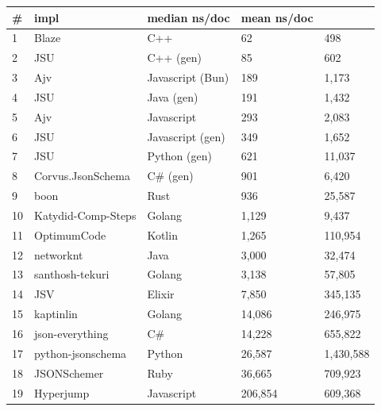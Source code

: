 \begin{tabular}{ll|l|ll}
\# & impl & median ns/doc & mean ns/doc \\
\hline
1 & Blaze & C++ & 62 & 498 \\
2 & JSU & C++ (gen) & 85 & 602 \\
3 & Ajv & Javascript (Bun) & 189 & 1,173 \\
4 & JSU & Java (gen) & 191 & 1,432 \\
5 & Ajv & Javascript & 293 & 2,083 \\
6 & JSU & Javascript (gen) & 349 & 1,652 \\
7 & JSU & Python (gen) & 621 & 11,037 \\
8 & Corvus.JsonSchema & C\# (gen) & 901 & 6,420 \\
9 & boon & Rust & 936 & 25,587 \\
10 & Katydid-Comp-Steps & Golang & 1,129 & 9,437 \\
11 & OptimumCode & Kotlin & 1,265 & 110,954 \\
12 & networknt & Java & 3,000 & 32,474 \\
13 & santhosh-tekuri & Golang & 3,138 & 57,805 \\
14 & JSV & Elixir & 7,850 & 345,135 \\
15 & kaptinlin & Golang & 14,086 & 246,975 \\
16 & json-everything & C\# & 14,228 & 655,822 \\
17 & python-jsonschema & Python & 26,587 & 1,430,588 \\
18 & JSONSchemer & Ruby & 36,665 & 709,923 \\
19 & Hyperjump & Javascript & 206,854 & 609,368 \\
\end{tabular}
